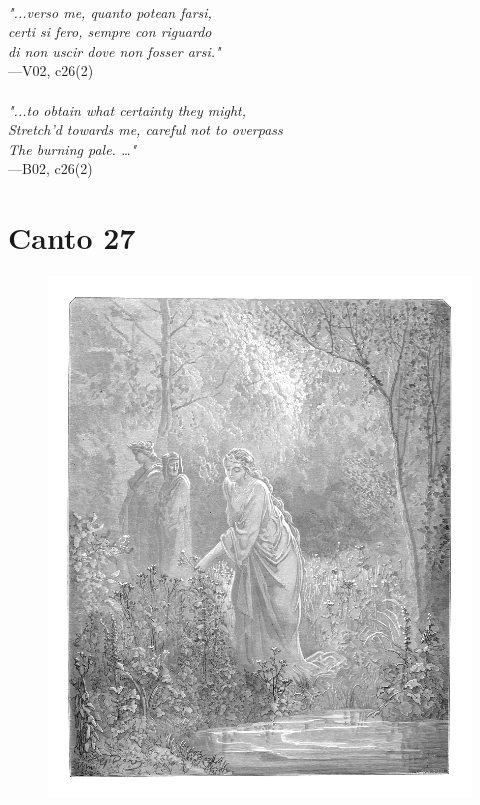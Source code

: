 \documentclass[../Dore_vision.tex]{subfiles}
\begin{document}
\begin{center}
\begin{minipage}{0.8\linewidth}
\textit{\\
"...verso me, quanto potean farsi,\\certi si fero, sempre con riguardo\\di non uscir dove non fosser arsi."} \\
—V02, c26(2) \\~\\
\textit{"...to obtain what certainty they might,\\Stretch'd towards me, careful not to overpass\\The burning pale. …"} \\
—B02, c26(2)
\end{minipage}
\end{center}

\newpage

\section{Canto 27}

\begin{figure}[ht]
\centering
\includegraphics[height=\figsize]{illustrations/book_2/V02, c27.jpg}
\end{figure}
\end{document}
